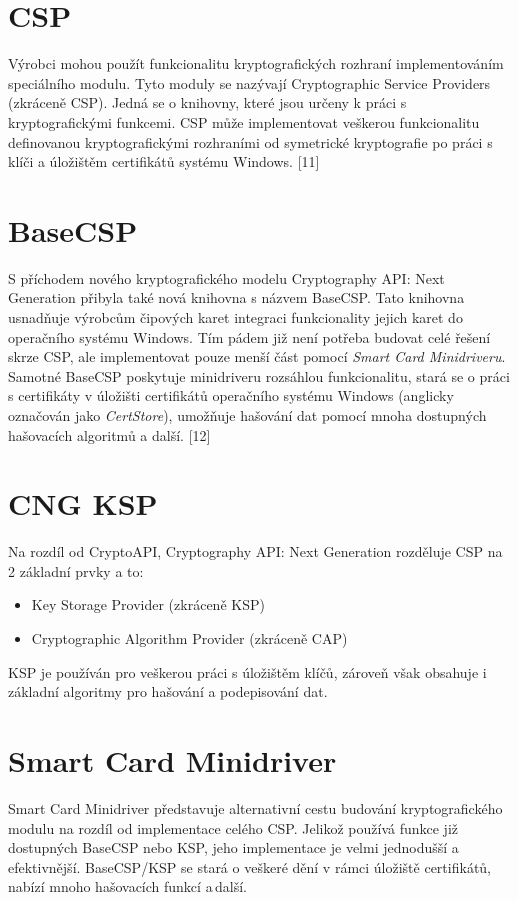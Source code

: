 \documentclass[]{fithesis3}
\begin{document}
	\section{CSP}
	
	Výrobci mohou použít funkcionalitu kryptografických rozhraní implementováním speciálního 			modulu. Tyto moduly se nazývají Cryptographic Service Providers (zkráceně CSP). Jedná se o 		knihovny, které jsou určeny k práci s kryptografickými funkcemi. CSP může 				implementovat veškerou funkcionalitu definovanou kryptografickými rozhraními od symetrické 		kryptografie po práci s klíči a úložištěm certifikátů systému Windows. [11]

	\section{BaseCSP}
	S příchodem nového kryptografického modelu Cryptography API: Next Generation přibyla také 		nová knihovna s názvem BaseCSP. Tato knihovna usnadňuje výrobcům čipových karet integraci 		funkcionality jejich karet do operačního systému Windows. Tím pádem již není potřeba budovat 		celé řešení skrze CSP, ale implementovat pouze menší část pomocí \textit{Smart Card 			Minidriveru}. Samotné BaseCSP poskytuje minidriveru rozsáhlou funkcionalitu, stará se o práci s 		certifikáty v úložišti certifikátů operačního systému Windows (anglicky označován jako 				\textit{CertStore}), umožňuje hašování dat pomocí mnoha dostupných hašovacích algoritmů a 		další. [12]

	\section{CNG KSP}
	Na rozdíl od CryptoAPI, Cryptography API: Next Generation rozděluje CSP na 2 základní prvky a 	to:
	\begin{itemize}
	\item Key Storage Provider (zkráceně KSP)
	\item Cryptographic Algorithm Provider (zkráceně CAP)
	\end{itemize}
	KSP je používán pro veškerou práci s úložištěm klíčů, zároveň však obsahuje i základní 				algoritmy pro hašování a podepisování dat.

	\section{Smart Card Minidriver}
	Smart Card Minidriver představuje alternativní cestu budování kryptografického modulu na rozdíl od implementace celého CSP. Jelikož používá funkce již dostupných BaseCSP nebo KSP, jeho 			implementace je velmi jednodušší a efektivnější. BaseCSP/KSP se stará o veškeré dění v rámci 		úložiště certifikátů, nabízí mnoho hašovacích funkcí a\,další.  \newline
\end{document}
